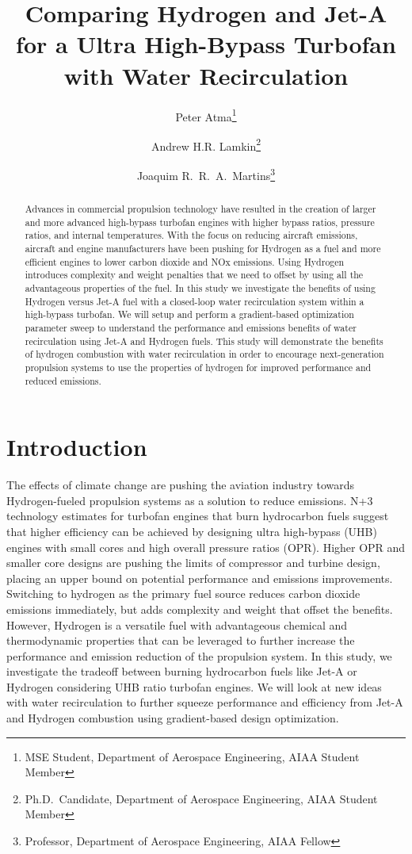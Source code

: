 \documentclass[conf]{new-aiaa}
\title{Comparing Hydrogen and Jet-A for a Ultra High-Bypass Turbofan with Water Recirculation} %
\author{Peter Atma\footnote{MSE Student, Department of Aerospace Engineering, AIAA Student Member}}
\author{Andrew H.R. Lamkin\footnote{Ph.D.~Candidate, Department of Aerospace Engineering, AIAA Student Member}}
\author{Joaquim R.~R.~A.~Martins\footnote{Professor, Department of Aerospace Engineering, AIAA Fellow}}
\affil{University of Michigan, Ann Arbor, MI, 48109}
\begin{document}
\maketitle

\begin{abstract}
	Advances in commercial propulsion technology have resulted in the creation of larger and more advanced high-bypass turbofan engines with higher bypass ratios, pressure ratios, and internal temperatures.
	With the focus on reducing aircraft emissions, aircraft and engine manufacturers have been pushing for Hydrogen as a fuel and more efficient engines to lower carbon dioxide and NOx emissions.
	Using Hydrogen introduces complexity and weight penalties that we need to offset by using all the advantageous properties of the fuel.
	In this study we investigate the benefits of using Hydrogen versus Jet-A fuel with a closed-loop water recirculation system within a high-bypass turbofan.
	We will setup and perform a gradient-based optimization parameter sweep to understand the performance and emissions benefits of water recirculation using Jet-A and Hydrogen fuels.
	This study will demonstrate the benefits of hydrogen combustion with water recirculation in order to encourage next-generation propulsion systems to use the properties of hydrogen for improved performance and reduced emissions.
\end{abstract}

\section{Introduction}
The effects of climate change are pushing the aviation industry towards Hydrogen-fueled propulsion systems as a solution to reduce emissions.
N+3 technology estimates for turbofan engines that burn hydrocarbon fuels suggest that higher efficiency can be achieved by designing ultra high-bypass (UHB) engines with small cores and high overall pressure ratios (OPR).
Higher OPR and smaller core designs are pushing the limits of compressor and turbine design, placing an upper bound on potential performance and emissions improvements.
Switching to hydrogen as the primary fuel source reduces carbon dioxide emissions immediately, but adds complexity and weight that offset the benefits.
However, Hydrogen is a versatile fuel with advantageous chemical and thermodynamic properties that can be leveraged to further increase the performance and emission reduction of the propulsion system.
In this study, we investigate the tradeoff between burning hydrocarbon fuels like Jet-A or Hydrogen considering UHB ratio turbofan engines.
We will look at new ideas with water recirculation to further squeeze performance and efficiency from Jet-A and Hydrogen combustion using gradient-based design optimization.
\end{document}
